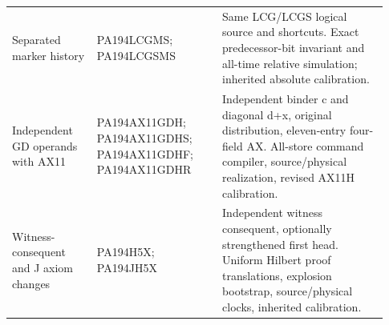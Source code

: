 \begin{longtable}{>{\raggedright\arraybackslash}p{0.21\linewidth}>{\raggedright\arraybackslash}p{0.31\linewidth}>{\raggedright\arraybackslash}p{0.41\linewidth}}
Separated marker history&PA194LCGMS; PA194LCGSMS&Same LCG/\allowbreak{}LCGS logical source and shortcuts. Exact predecessor-bit invariant and all-time relative simulation; inherited absolute calibration.\\[5pt]
Independent GD operands with AX11&PA194AX11GDH; PA194AX11GDHS; PA194AX11GDHF; PA194AX11GDHR&Independent binder c and diagonal d+x, original distribution, eleven-entry four-field AX. All-store command compiler, source/\allowbreak{}physical realization, revised AX11H calibration.\\[5pt]
Witness-consequent and J axiom changes&PA194H5X; PA194JH5X&Independent witness consequent, optionally strengthened first head. Uniform Hilbert proof translations, explosion bootstrap, source/\allowbreak{}physical clocks, inherited calibration.\\[5pt]
\end{longtable}\endgroup
